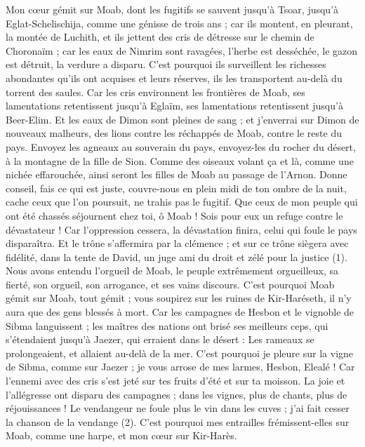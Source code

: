 \begin{multicols}{2}
Mon cœur gémit sur Moab, dont les fugitifs se sauvent jusqu’à Tsoar, jusqu’à Eglat-Schelischija, comme une génisse de trois ans ; car ils montent, en pleurant, la montée de Luchith, et ils jettent des cris de détresse sur le chemin de Choronaïm ;
car les eaux de Nimrim sont ravagées, l’herbe est desséchée, le gazon est détruit, la verdure a disparu.
C’est pourquoi ils surveillent les richesses abondantes qu’ils ont acquises et leurs réserves, ils les transportent au-delà du torrent des saules.
Car les cris environnent les frontières de Moab, ses lamentations retentissent jusqu'à Eglaïm, ses lamentations retentissent jusqu'à Beer-Elim.
Et les eaux de Dimon sont pleines de sang ; et j’enverrai sur Dimon de nouveaux malheurs, des lions contre les réchappés de Moab, contre le reste du pays.
\VerseOne{}Envoyez les agneaux au souverain du pays, envoyez-les du rocher du désert, à la montagne de la fille de Sion.
Comme des oiseaux volant ça et là, comme une nichée effarouchée, ainsi seront les filles de Moab au passage de l’Arnon.
Donne conseil, fais ce qui est juste, couvre-nous en plein midi de ton ombre de la nuit, cache ceux que l’on poursuit, ne trahis pas le fugitif.
Que ceux de mon peuple qui ont été chassés séjournent chez toi, ô Moab ! Sois pour eux un refuge contre le dévastateur ! Car l’oppression cessera, la dévastation finira, celui qui foule le pays disparaîtra.
Et le trône s’affermira par la clémence ; et sur ce trône siègera avec fidélité, dans la tente de David, un juge ami du droit et zélé pour la justice (1).
Nous avons entendu l'orgueil de Moab, le peuple extrêmement orgueilleux, sa fierté, son orgueil, son arrogance, et ses vains discours.
C'est pourquoi Moab gémit sur Moab, tout gémit ; vous soupirez sur les ruines de Kir-Haréseth, il n'y aura que des gens blessés à mort.
Car les campagnes de Hesbon et le vignoble de Sibma languissent ; les maîtres des nations ont brisé ses meilleurs ceps, qui s’étendaient jusqu’à Jaezer, qui erraient dans le désert : Les rameaux se prolongeaient, et allaient au-delà de la mer.
C'est pourquoi je pleure sur la vigne de Sibma, comme sur Jaezer ; je vous arrose de mes larmes, Hesbon, Elealé ! Car l'ennemi avec des cris s'est jeté sur tes fruits d'été et sur ta moisson.
La joie et l’allégresse ont disparu des campagnes ; dans les vignes, plus de chants, plus de réjouissances ! Le vendangeur ne foule plus le vin dans les cuves ; j’ai fait cesser la chanson de la vendange (2).
C'est pourquoi mes entrailles frémissent-elles sur Moab, comme une harpe, et mon cœur sur Kir-Harès.

\end{multicols}
